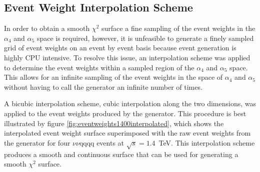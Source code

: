 
\subsection{Event Weight Interpolation Scheme}
\label{sec:eventweightsinterpolation}
In order to obtain a smooth $\chi^{2}$ surface a fine sampling of the event weights in the $\alpha_{4}$ and $\alpha_{5}$ space is required, however, it is unfeasible to generate a finely sampled grid of event weights on an event by event basis because event generation is highly CPU intensive.  To resolve this issue, an interpolation scheme was applied to determine the event weights within a sampled region of the $\alpha_{4}$ and $\alpha_{5}$ space.  This allows for an infinite sampling of the event weights in the space of $\alpha_{4}$ and $\alpha_{5}$ without having to call the generator an infinite number of times.

A bicubic interpolation scheme, cubic interpolation along the two dimensions, was applied to the event weights produced by the generator.  This procedure is best illustrated by figure \ref{fig:eventweights1400interpolated}, which shows the interpolated event weight surface superimposed with the raw event weights from the generator for four $\nu\nu\text{qqqq}$ events at $\sqrt{s}=1.4$~TeV.  This interpolation scheme produces a smooth and continuous surface that can be used for generating a smooth $\chi^{2}$ surface.  

